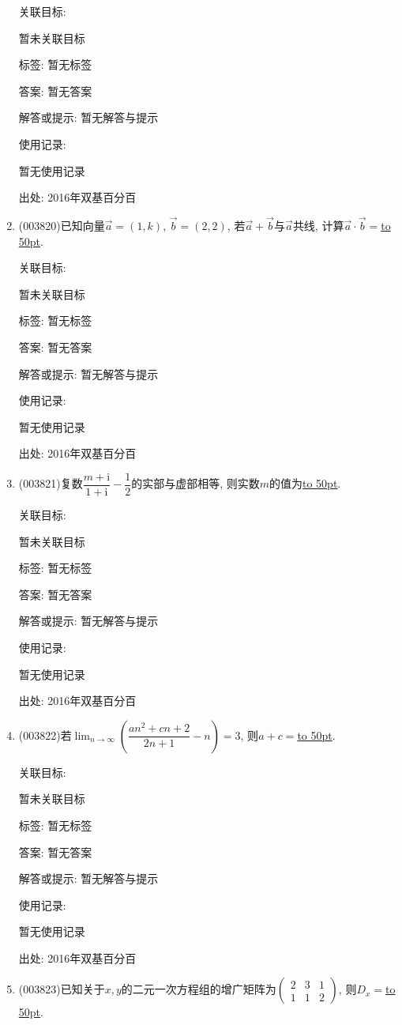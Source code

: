 \documentclass[10pt,a4paper]{article}
\newcommand{\blank}[1]{\underline{\hbox to #1pt{}}}
\begin{document}
\begin{enumerate}[1.]
关联目标:

暂未关联目标



标签: 暂无标签

答案: 暂无答案

解答或提示: 暂无解答与提示

使用记录:

暂无使用记录


出处: 2016年双基百分百
\item { (003820)}已知向量$\overrightarrow{a}=(1,k)$, $\overrightarrow{b}=(2,2)$, 若$\overrightarrow{a}+\overrightarrow{b}$与$\overrightarrow{a}$共线, 计算$\overrightarrow{a}\cdot\overrightarrow{b}=$\blank{50}.


关联目标:

暂未关联目标



标签: 暂无标签

答案: 暂无答案

解答或提示: 暂无解答与提示

使用记录:

暂无使用记录


出处: 2016年双基百分百
\item { (003821)}复数$\dfrac{m+\mathrm{i}}{1+\mathrm{i}}-\dfrac 12$的实部与虚部相等, 则实数$m$的值为\blank{50}.


关联目标:

暂未关联目标



标签: 暂无标签

答案: 暂无答案

解答或提示: 暂无解答与提示

使用记录:

暂无使用记录


出处: 2016年双基百分百
\item { (003822)}若$\displaystyle\lim_{n\to \infty}\left(\dfrac{an^2+cn+2}{2n+1}-n\right)=3$, 则$a+c=$\blank{50}.


关联目标:

暂未关联目标



标签: 暂无标签

答案: 暂无答案

解答或提示: 暂无解答与提示

使用记录:

暂无使用记录


出处: 2016年双基百分百
\item { (003823)}已知关于$x,y$的二元一次方程组的增广矩阵为$\begin{pmatrix}2 & 3 & 1 \\1 & 1 & 2\end{pmatrix}$, 则$D_x=$\blank{50}.



\end{enumerate}
\end{document}
